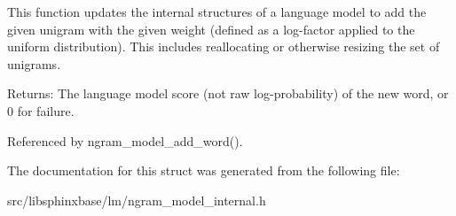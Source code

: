 This function updates the internal structures of a language model to add the given unigram with the given weight (defined as a log-factor applied to the uniform distribution). This includes reallocating or otherwise resizing the set of unigrams.

\begin{Desc}
\item[Returns:]The language model score (not raw log-probability) of the new word, or 0 for failure. \end{Desc}


Referenced by ngram\_\-model\_\-add\_\-word().

The documentation for this struct was generated from the following file:\begin{CompactItemize}
\item 
src/libsphinxbase/lm/ngram\_\-model\_\-internal.h\end{CompactItemize}

